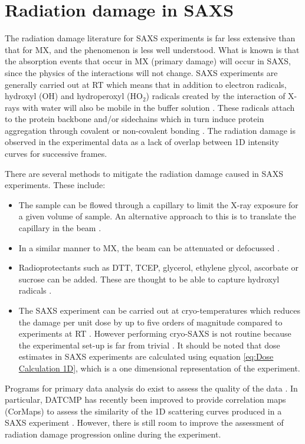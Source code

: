 \section{Radiation damage in SAXS}
\label{sec:Radiation damage in SAXS}
    The radiation damage literature for SAXS experiments is far less extensive than that for MX, and the phenomenon is less well understood.
    What is known is that the absorption events that occur in MX (primary damage) will occur in SAXS, since the physics of the interactions will not change.
    SAXS experiments are generally carried out at RT which means that in addition to electron radicals, hydroxyl (OH) and hydroperoxyl (HO$_2$) radicals created by the interaction of X-rays with water will also be mobile in the buffer solution \cite{jeffries2015limiting,garrison1987reaction}.
    These radicals attach to the protein backbone and/or sidechains which in turn induce protein aggregation through covalent or non-covalent bonding \cite{kuwamoto2004radiation}.
    The radiation damage is observed in the experimental data as a lack of overlap between 1D intensity curves for successive frames.

    There are several methods to mitigate the radiation damage caused in SAXS experiments. These include:
    \begin{itemize}
        \item The sample can be flowed through a capillary to limit the X-ray exposure for a given volume of sample. An alternative approach to this is to translate the capillary in the beam \cite{jeffries2015limiting}.
        \item In a similar manner to MX, the beam can be attenuated or defocussed \cite{jeffries2015limiting}.
        \item Radioprotectants such as DTT, TCEP, glycerol, ethylene glycol, ascorbate or sucrose can be added. These are thought to be able to capture hydroxyl radicals \cite{grishaev2012sample}.
        \item The SAXS experiment can be carried out at cryo-temperatures which reduces the damage per unit dose by up to five orders of magnitude compared to experiments at RT \cite{meisburger2013breaking}. However performing cryo-SAXS is not routine because the experimental set-up is far from trivial \cite{jeffries2015limiting}. It should be noted that dose estimates in SAXS experiments are calculated using equation \ref{eq:Dose Calculation 1D}, which is a one dimensional representation of the experiment.
    \end{itemize}

    Programs for primary data analysis do exist to assess the quality of the data \cite{petoukhov2012new}. In particular, DATCMP has recently been improved to provide correlation maps (CorMaps) to assess the similarity of the 1D scattering curves produced in a SAXS experiment \cite{franke2015correlation}. However, there is still room to improve the assessment of radiation damage progression online during the experiment.
